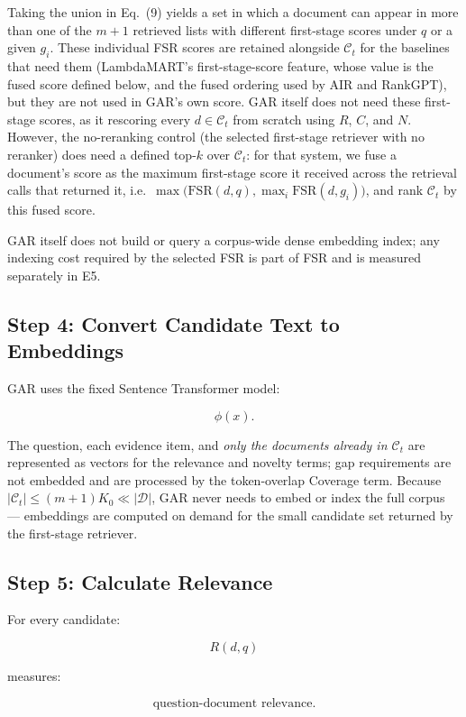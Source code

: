 \documentclass[11pt,a4paper]{article}
\begin{document}
Taking the union in Eq.~(9) yields a set in which a document can appear in more than one of the $m+1$ retrieved lists with different first-stage scores under $q$ or a given $g_i$. These individual FSR scores are retained alongside $\mathcal{C}_t$ for the baselines that need them (LambdaMART's first-stage-score feature, whose value is the fused score defined below, and the fused ordering used by AIR and RankGPT), but they are not used in GAR's own score. GAR itself does not need these first-stage scores, as it rescoring every $d\in\mathcal{C}_t$ from scratch using $R$, $C$, and $N$. However, the no-reranking control (the selected first-stage retriever with no reranker) does need a defined top-$k$ over $\mathcal{C}_t$: for that system, we fuse a document's score as the maximum first-stage score it received across the retrieval calls that returned it, i.e.\ $\max\big(\mathrm{FSR}(d,q),\max_i \mathrm{FSR}(d,g_i)\big)$, and rank $\mathcal{C}_t$ by this fused score.

GAR itself does not build or query a corpus-wide dense embedding index; any indexing cost required by the selected FSR is part of FSR and is measured separately in E5.

\subsection{Step 4: Convert Candidate Text to Embeddings}

GAR uses the fixed Sentence Transformer model:

\[
\phi(x).
\]

The question, each evidence item, and \emph{only the documents already in $\mathcal{C}_t$} are represented as vectors for the relevance and novelty terms; gap requirements are not embedded and are processed by the token-overlap Coverage term. Because $|\mathcal{C}_t|\le(m+1)K_0\ll|\mathcal{D}|$, GAR never needs to embed or index the full corpus --- embeddings are computed on demand for the small candidate set returned by the first-stage retriever.

\subsection{Step 5: Calculate Relevance}

For every candidate:

\[
R(d,q)
\]

measures:

\[
\text{question-document relevance}.
\]
\end{document}
